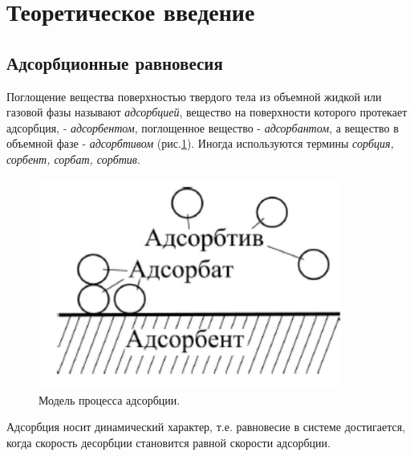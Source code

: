 \documentclass[a4paper,12pt]{article} %
\begin{document}
\section*{Теоретическое введение}
\subsection*{Адсорбционные равновесия}
Поглощение вещества поверхностью твердого тела из объемной жидкой или газовой фазы называют \textit{адсорбцией}, вещество на поверхности которого протекает адсорбция, - \textit{адсорбентом}, поглощенное вещество - \textit{адсорбантом}, а вещество в объемной фазе - \textit{адсорбтивом} (рис.\ref{AD}). Иногда используются термины \textit{сорбция, сорбент, сорбат, сорбтив}.
\begin{figure}[H]
  \begin{minipage}[c]{0.5\textwidth}
    \includegraphics[width=10cm]{adsorb.png}
  \end{minipage}\hfill
  \begin{minipage}[c]{0.4\textwidth}
    \caption{
       Модель процесса адсорбции.
    } \label{AD}
  \end{minipage}
\end{figure}
\par
Адсорбция носит динамический характер, т.е. равновесие в системе достигается, когда скорость десорбции становится равной скорости адсорбции.
\end{document}
